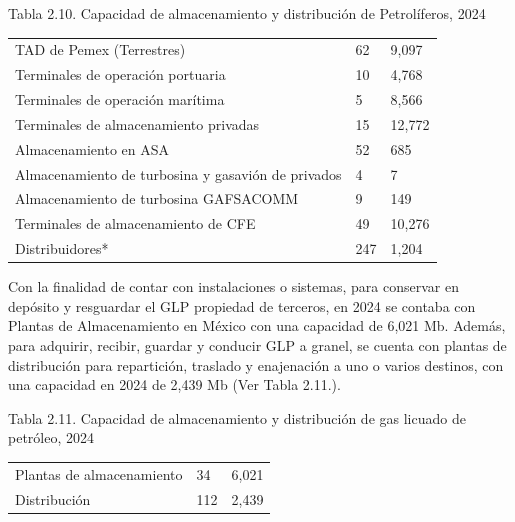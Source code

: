 \documentclass{sener2025}
\begin{document}
\begin{tabladoradoCorto}
  \caption{Tabla 2.10. Capacidad de almacenamiento y distribución de Petrolíferos, 2024}
  \label{tab:tabla_2_10__capacidad_de_almac}
  \begin{tabularx}{\textwidth}{Vvv}
    \toprule
      &  &  \\
    \midrule
    TAD de Pemex (Terrestres) & 62 & 9,097 \\
    Terminales de operación portuaria & 10 & 4,768 \\
    Terminales de operación marítima & 5 & 8,566 \\
    Terminales de almacenamiento privadas & 15 & 12,772 \\
    Almacenamiento en ASA & 52 & 685 \\
    Almacenamiento de turbosina y gasavión de privados & 4  & 7 \\
    Almacenamiento de turbosina GAFSACOMM & 9 & 149 \\
    Terminales de almacenamiento de CFE & 49 & 10,276 \\
    Distribuidores* & 247 & 1,204 \\
    \bottomrule
  \end{tabularx}
\end{tabladoradoCorto}
\vspace{-4pt}


Con la finalidad de contar con instalaciones o sistemas, para conservar en depósito y resguardar el GLP propiedad de terceros, en 2024 se contaba con Plantas de Almacenamiento en México con una capacidad de 6,021 Mb. Además, para adquirir, recibir, guardar y conducir GLP a granel, se cuenta con plantas de distribución para repartición, traslado y enajenación a uno o varios destinos, con una capacidad en 2024 de 2,439 Mb (Ver Tabla 2.11.).

\begin{tabladoradoCorto}
  \caption{Tabla 2.11. Capacidad de almacenamiento y distribución de gas licuado de petróleo, 2024}
  \label{tab:tabla_2_11__capacidad_de_almac}
  \begin{tabularx}{\textwidth}{Vvv}
    \toprule
      &  &  \\
    \midrule
    Plantas de almacenamiento & 34 & 6,021 \\
    Distribución & 112 & 2,439 \\
    \bottomrule
  \end{tabularx}
\end{tabladoradoCorto}
\vspace{-4pt}
\end{document}
